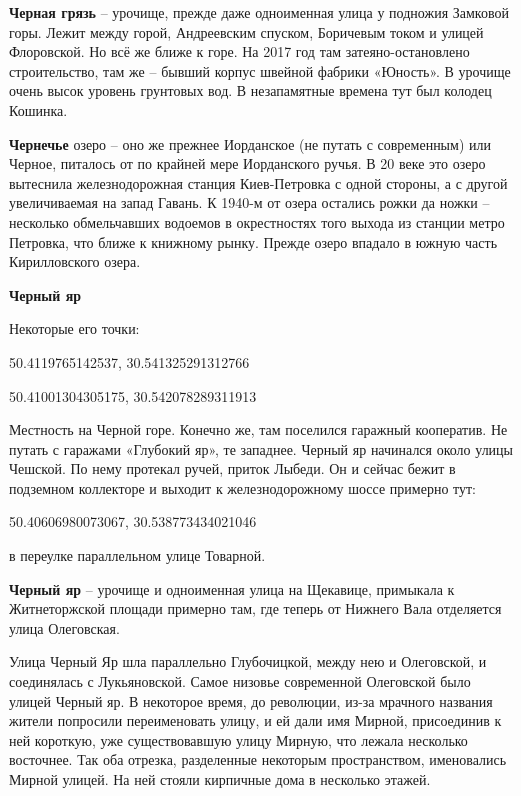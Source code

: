 \medskip

\textbf{Черная грязь} – урочище, прежде даже одноименная улица у подножия Замковой горы. Лежит между горой, Андреевским спуском, Боричевым током и улицей Флоровской. Но всё же ближе к горе. На 2017 год там затеяно-остановлено строительство, там же – бывший корпус швейной фабрики «Юность». В урочище очень высок уровень грунтовых вод. В незапамятные времена тут был колодец Кошинка.\\

\medskip

\textbf{Чернечье} озеро – оно же прежнее Иорданское (не путать с современным) или Черное, питалось от по крайней мере Иорданского ручья. В 20 веке это озеро вытеснила железнодорожная станция Киев-Петровка с одной стороны, а с другой увеличиваемая на запад Гавань. К 1940-м от озера остались рожки да ножки – несколько обмельчавших водоемов в окрестностях того выхода из станции метро Петровка, что ближе к книжному рынку. Прежде озеро впадало в южную часть Кирилловского озера.\\ 

\medskip

\textbf{Черный яр} 

Некоторые его точки:

50.4119765142537, 30.541325291312766

50.41001304305175, 30.542078289311913

Местность на Черной горе. Конечно же, там поселился гаражный кооператив. Не путать с гаражами «Глубокий яр», те западнее. Черный яр начинался около улицы Чешской. По нему протекал ручей, приток Лыбеди. Он и сейчас бежит в подземном коллекторе и выходит к железнодорожному шоссе примерно тут:

50.40606980073067, 30.538773434021046

в переулке параллельном улице Товарной.\\

\medskip

\textbf{Черный яр} – урочище и одноименная улица на Щекавице, примыкала к Житнеторжской площади примерно там, где теперь от Нижнего Вала отделяется улица Олеговская. 

Улица Черный Яр шла параллельно Глубочицкой, между нею и Олеговской, и соединялась с Лукьяновской. Самое низовье современной Олеговской было улицей Черный яр. В некоторое время, до революции, из-за мрачного названия жители попросили переименовать улицу, и ей дали имя Мирной, присоединив к ней короткую, уже существовавшую улицу Мирную, что лежала несколько восточнее. Так оба отрезка, разделенные некоторым пространством, именовались Мирной улицей. На ней стояли кирпичные дома в несколько этажей.

